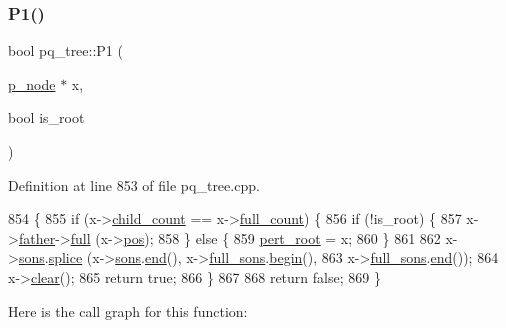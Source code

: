 \subsubsection{\texorpdfstring{P1()}{P1()}}
{\footnotesize\ttfamily bool pq\+\_\+tree\+::\+P1 (\begin{DoxyParamCaption}\item[{\mbox{\hyperlink{classp__node}{p\+\_\+node}} $\ast$}]{x,  }\item[{bool}]{is\+\_\+root }\end{DoxyParamCaption})\hspace{0.3cm}{\ttfamily [private]}}



Definition at line 853 of file pq\+\_\+tree.\+cpp.


\begin{DoxyCode}
854 \{
855     \textcolor{keywordflow}{if} (x->\mbox{\hyperlink{classp__node_a74d5be4f6767bda5b5803dc2f0987b74}{child\_count}} == x->\mbox{\hyperlink{classp__node_a67a7570ace6b26d3bcbff7cf71c85cb0}{full\_count}}) \{
856     \textcolor{keywordflow}{if} (!is\_root) \{
857         x->\mbox{\hyperlink{classpq__node_a3e7c886498c76c633f057fb42ff9c435}{father}}->\mbox{\hyperlink{classpq__node_af1ba861293e4493dba7cc2c9332fee76}{full}} (x->\mbox{\hyperlink{classpq__node_a5e8a5defa0fec4ff2e82fabee97296b4}{pos}});
858     \} \textcolor{keywordflow}{else} \{
859         \mbox{\hyperlink{classpq__tree_adf0d16ca5a29bfbe863efb525135ac01}{pert\_root}} = x;
860     \}
861     
862     x->\mbox{\hyperlink{classpq__node_a2cc030cfa4560872acea8b50ebd0542b}{sons}}.\mbox{\hyperlink{classsymlist_ac2bd4d9db62ea6a3282662c62a97c3b2}{splice}} (x->\mbox{\hyperlink{classpq__node_a2cc030cfa4560872acea8b50ebd0542b}{sons}}.\mbox{\hyperlink{classsymlist_a7283589fa01f79d722f8256d7a6a7883}{end}}(), x->\mbox{\hyperlink{classp__node_a09658fb7a7212e51b877444e4cee4378}{full\_sons}}.\mbox{\hyperlink{classsymlist_a525b8d44af5d771fe15916372515cce0}{begin}}(),
863         x->\mbox{\hyperlink{classp__node_a09658fb7a7212e51b877444e4cee4378}{full\_sons}}.\mbox{\hyperlink{classsymlist_a7283589fa01f79d722f8256d7a6a7883}{end}}());
864     x->\mbox{\hyperlink{classp__node_af24fe11743b0836b03c108a1bf8a0995}{clear}}();
865     \textcolor{keywordflow}{return} \textcolor{keyword}{true};
866     \} 
867     
868     \textcolor{keywordflow}{return} \textcolor{keyword}{false};
869 \}
\end{DoxyCode}
Here is the call graph for this function\+:\nopagebreak
